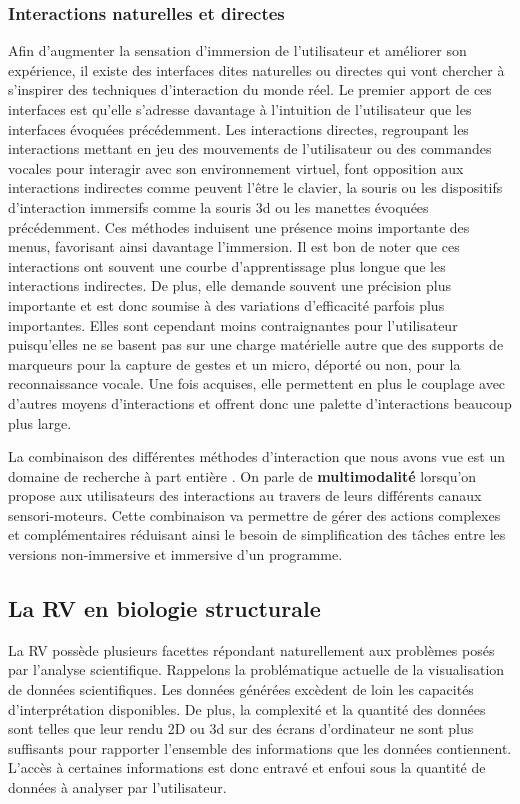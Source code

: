 \subsubsection{Interactions naturelles et directes} \label{interface_nature}

Afin d'augmenter la sensation d'immersion de l'utilisateur et améliorer son expérience, il existe des interfaces dites naturelles ou directes qui vont chercher à s'inspirer des techniques d'interaction du monde réel. Le premier apport de ces interfaces est qu'elle s'adresse davantage à l'intuition de l'utilisateur que les interfaces évoquées précédemment.
Les interactions directes, regroupant les interactions mettant en jeu des mouvements de l'utilisateur ou des commandes vocales pour interagir avec son environnement virtuel, font opposition aux interactions indirectes comme peuvent l'être le clavier, la souris ou les dispositifs d'interaction immersifs comme la souris 3d ou les manettes évoquées précédemment. Ces méthodes induisent une présence moins importante des menus, favorisant ainsi davantage l'immersion. Il est bon de noter que ces interactions ont souvent une courbe d'apprentissage plus longue que les interactions indirectes. De plus, elle demande souvent une précision plus importante et est donc soumise à des variations d'efficacité parfois plus importantes. Elles sont cependant moins contraignantes pour l'utilisateur puisqu'elles ne se basent pas sur une charge matérielle autre que des supports de marqueurs pour la capture de gestes et un micro, déporté ou non, pour la reconnaissance vocale. Une fois acquises, elle permettent en plus le couplage avec d'autres moyens d'interactions et offrent donc une palette d'interactions beaucoup plus large.

La combinaison des différentes méthodes d'interaction que nous avons vue est un domaine de recherche à part entière \cite{martin_hardware_2014,martin_reconfigurable_2011}. On parle de \textbf{multimodalité} lorsqu'on propose aux utilisateurs des interactions au travers de leurs différents canaux sensori-moteurs. Cette combinaison va permettre de gérer des actions complexes et complémentaires réduisant ainsi le besoin de simplification des tâches entre les versions non-immersive et immersive d'un programme.

\subsection{La RV en biologie structurale}

La RV possède plusieurs facettes répondant naturellement aux problèmes posés par l'analyse scientifique. Rappelons la problématique actuelle de la visualisation de données scientifiques. Les données générées excèdent de loin les capacités d'interprétation disponibles. De plus, la complexité et la quantité des données sont telles que leur rendu 2D ou 3d sur des écrans d'ordinateur ne sont plus suffisants pour rapporter l'ensemble des informations que les données contiennent. L'accès à certaines informations est donc entravé et enfoui sous la quantité de données à analyser par l'utilisateur.

